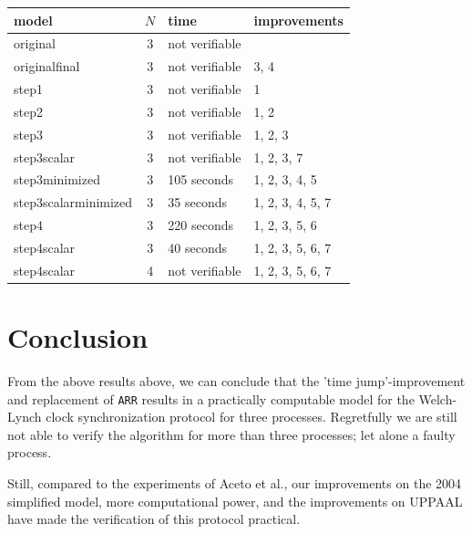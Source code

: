 \documentclass[a4paper,10pt]{article}
\newcommand{\oldsimple}{2004 simplified model\xspace}
\begin{document}
\vspace{1 em}

\begin{tabular}{|l|c|l|l|}
\hline
\textbf{model} & \textbf{$N$} & \textbf{time} & \textbf{improvements} \\ \hline
original & 3 & not verifiable & \\ \hline
originalfinal & 3 & not verifiable & 3, 4 \\ \hline
step1 & 3 & not verifiable & 1 \\ \hline
step2 & 3 & not verifiable & 1, 2 \\ \hline
step3 & 3 & not verifiable & 1, 2, 3 \\ \hline
step3scalar & 3 & not verifiable & 1, 2, 3, 7 \\ \hline
step3minimized & 3 & 105 seconds & 1, 2, 3, 4, 5 \\ \hline
step3scalarminimized & 3 & 35 seconds & 1, 2, 3, 4, 5, 7 \\ \hline
step4 & 3 & 220 seconds & 1, 2, 3, 5, 6\\ \hline
step4scalar & 3 & 40 seconds & 1, 2, 3, 5, 6, 7 \\ \hline
step4scalar & 4 & not verifiable & 1, 2, 3, 5, 6, 7 \\ \hline
\end{tabular}


\section{Conclusion}
	

From the above results above, we can conclude that the 'time jump'-improvement and replacement of \texttt{ARR} results in a practically computable model for the Welch-Lynch clock synchronization protocol for three processes. Regretfully we are still not able to verify the algorithm for more than three processes; let alone a faulty process.

Still, compared to the experiments of Aceto et al., our improvements on the \oldsimple, more computational power, and the improvements on UPPAAL have made the verification of this protocol practical.



\end{document}
